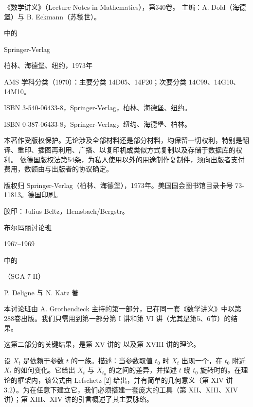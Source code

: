 《数学讲义》（Lecture Notes in Mathematics），第340卷。
主编：A. Dold（海德堡）与 B. Eckmann（苏黎世）。

\begin{center}\Large {}中的\par\normalsize Springer-Verlag\par 柏林、海德堡、纽约，1973年\end{center}
AMS 学科分类（1970）：主要分类 14D05、14F20；次要分类 14C99、14G10、14M10。

ISBN 3-540-06433-8，Springer-Verlag，柏林、海德堡、纽约。

ISBN 0-387-06433-8，Springer-Verlag，纽约、海德堡、柏林。

本著作受版权保护。无论涉及全部材料还是部分材料，均保留一切权利，特别是翻译、重印、插图再利用、广播、以复印机或类似方式复制以及存储于数据库的权利。
依德国版权法第54条，为私人使用以外的用途制作复制件，须向出版者支付费用，数额由与出版者的协议确定。

版权归 Springer-Verlag（柏林、海德堡），1973年。美国国会图书馆目录卡号 73-11813。德国印刷。

胶印：Julius Beltz，Hemsbach/Bergstr。
\begin{center}
布尔玛丽讨论班\par 1967--1969\bigskip

{\Large {}中的}\par（SGA 7 II）\bigskip

P. Deligne 与 N. Katz 著
\end{center}
本讨论班由 A. Grothendieck 主持的第一部分，已在同一套《数学讲义》中以第288卷出版。我们只需用到第一部分第 I 讲和第 VI 讲（尤其是第5、6节）的结果。

这第二部分的关键结果，是第 XV 讲的 以及第 XVIII 讲的理论。

设 $X_t$ 是依赖于参数 $t$ 的一族。描述：当参数取值 $t_0$ 时 $X_t$ 出现一个，在 $t_0$ 附近 $X_t$ 的如何变化。它给出 $X_t$ 与 $X_{t_0}$ 的之间的差异，并描述 $t$ 绕 $t_0$ 旋转时的。在理论的框架内，该公式由 Lefschetz [2] 给出，并有简单的几何意义（第 XIV 讲 3.2）。为在任意下建立它，我们必须搭建一套庞大的工具（第 XII、XIII、XIV 讲）；第 XIII、XIV 讲的引言概述了其主要脉络。

